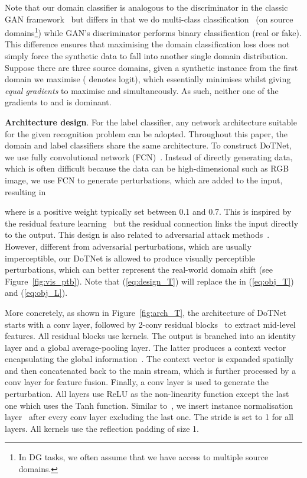 \documentclass[letterpaper]{article}
\newcommand{\keypoint}[1]{\vspace{0.1cm}\noindent\textbf{#1}}
\begin{document}
Note that our domain classifier is analogous to the discriminator in the classic GAN framework~\cite{goodfellow2014generative} but differs in that we do multi-class classification~\cite{odena2017conditional} (on source domains\footnote{In DG tasks, we often assume that we have access to multiple source domains.}) while GAN's discriminator performs binary classification (real or fake). This difference ensures that maximising the domain classification loss does not simply force the synthetic data to fall into another single domain distribution. Suppose there are three source domains, given a synthetic instance from the first domain we maximise  ( denotes logit), which essentially minimises  whilst giving \emph{equal gradients} to maximise  and  simultaneously. As such, neither one of the gradients to  and  is dominant.

\keypoint{Architecture design}.
For the label classifier, any network architecture suitable for the given recognition problem can be adopted. Throughout this paper, the domain and label classifiers share the same architecture. To construct DoTNet, we use fully convolutional network (FCN)~\cite{seg_fcn}. Instead of directly generating data, which is often difficult because the data can be high-dimensional such as RGB image, we use FCN to generate perturbations, which are added to the input, resulting in

where  is a positive weight typically set between 0.1 and 0.7. This is inspired by the residual feature learning~\cite{he2016deep} but the residual connection links the input directly to the output. This design is also related to adversarial attack methods~\cite{szegedy2014intriguing,goodfellow2015explaining}.
However, different from adversarial perturbations, which are usually imperceptible, our DoTNet is allowed to produce visually perceptible perturbations, which can better represent the real-world domain shift (see Figure~\ref{fig:vis_ptb}). Note that (\ref{eq:design_T}) will replace the  in (\ref{eq:obj_T}) and (\ref{eq:obj_L}).

More concretely, as shown in Figure~\ref{fig:arch_T}, the architecture of DoTNet starts with a  conv layer, followed by  2-conv residual blocks~\cite{he2016deep} to extract mid-level features. All residual blocks use  kernels. The output is branched into an identity layer and a global average-pooling layer. The latter produces a context vector encapsulating the global information~\cite{liu2016parsenet}. The context vector is expanded spatially and then concatenated back to the main stream, which is further processed by a  conv layer for feature fusion. Finally, a  conv layer is used to generate the perturbation. All layers use ReLU as the non-linearity function except the last one which uses the Tanh function. Similar to~\cite{zhu2017unpaired}, we insert instance normalisation layer~\cite{Ulyanov_2017_CVPR} after every conv layer excluding the last one. The stride is set to 1 for all layers. All  kernels use the reflection padding of size 1.
\end{document}
